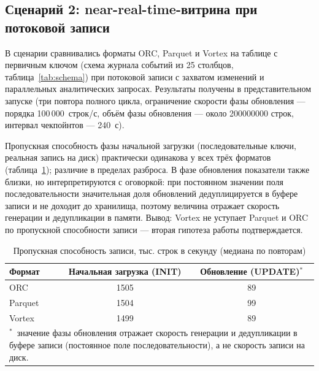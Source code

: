 \subsection{Сценарий 2: near-real-time-витрина при потоковой записи}

В сценарии сравнивались форматы ORC, Parquet и Vortex на таблице с первичным ключом
(схема журнала событий из 25 столбцов, таблица~\ref{tab:schema}) при потоковой записи
с захватом изменений и параллельных аналитических запросах. Результаты получены в
представительном запуске (три повтора полного цикла, ограничение скорости фазы
обновления --- порядка 100\,000~строк/с, объём фазы обновления --- около
\num{200000000} строк, интервал чекпойнтов --- 240~с).

Пропускная способность фазы начальной загрузки (последовательные
ключи, реальная запись на диск) практически одинакова у всех трёх форматов
(таблица~\ref{tab:write}); различие в пределах разброса. В фазе обновления показатели
также близки, но интерпретируются с оговоркой: при постоянном значении поля
последовательности значительная доля обновлений дедуплицируется в буфере записи и не
доходит до хранилища, поэтому величина отражает скорость генерации и дедупликации в
памяти. Вывод: Vortex не уступает Parquet и ORC по пропускной способности записи ---
вторая гипотеза работы подтверждается.

\begin{table}
    \caption{Пропускная способность записи, тыс. строк в секунду (медиана по повторам)}
    \label{tab:write}
    \begin{tabularx}{\textwidth}{|X|c|c|}\hline
    \textbf{Формат} & \textbf{Начальная загрузка (INIT)} & \textbf{Обновление (UPDATE)$^{*}$} \\ \hline
    ORC     & 1505 & 89 \\ \hline
    Parquet & 1504 & 99 \\ \hline
    Vortex  & 1499 & 89 \\ \hline
    \multicolumn{3}{|p{0.95\textwidth}|}{\footnotesize $^{*}$~значение фазы обновления отражает скорость генерации и дедупликации в буфере записи (постоянное поле последовательности), а не скорость записи на диск.} \\ \hline
    \end{tabularx}
\end{table}


